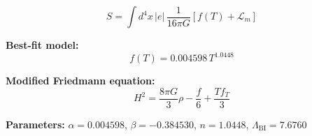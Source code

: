 
\begin{equation}
  S = \int d^4x \, |e| \, \frac{1}{16\pi G} \left[ f(T) + \mathcal{L}_m \right]
\end{equation}

\textbf{Best-fit model:}
\begin{equation}
  f(T) = 0.004598 \, T^{1.0448}
\end{equation}

\textbf{Modified Friedmann equation:}
\begin{equation}
  H^2 = \frac{8\pi G}{3} \rho - \frac{f}{6} + \frac{T f_T}{3}
\end{equation}

\textbf{Parameters:}
$\alpha = 0.004598$, \quad
$\beta = -0.384530$, \quad
$n = 1.0448$, \quad
$\Lambda_{\text{BI}} = 7.6760$